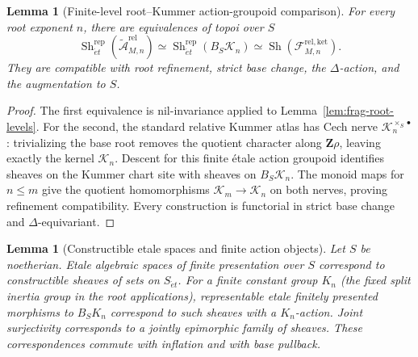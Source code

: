 \documentclass[11pt]{article}
\newtheorem{lemma}[theorem]{Lemma}
\theoremstyle{definition}
\theoremstyle{remark}
\begin{document}
\begin{lemma}[Finite-level root--Kummer action-groupoid comparison]
\label{lem:frag-finite-root-kummer-comparison}
For every root exponent $n$, there are equivalences of topoi over $S$
\begin{equation}
 \operatorname{Sh}_{\acute et}^{\mathrm{rep}}
 (\widetilde{\mathcal A}_{M,n}^{\mathrm{rel}})
 \simeq
 \operatorname{Sh}_{\acute et}^{\mathrm{rep}}(B_S\mathcal K_n)
 \simeq
 \operatorname{Sh}(\mathcal F_{M,n}^{\mathrm{rel,ket}}).
 \label{eq:frag-finite-root-kummer-topoi}
\end{equation}
They are compatible with root refinement, strict base change, the
$\Delta$-action, and the augmentation to $S$.
\end{lemma}

\begin{proof}
The first equivalence is nil-invariance applied to
Lemma~\ref{lem:frag-root-levels}.  For the second, the standard relative
Kummer atlas has Cech nerve
$\mathcal K_n^{\times_S\bullet}$: trivializing the base root removes the
quotient character along $\mathbf Z\rho$, leaving exactly the kernel
$\mathcal K_n$.  Descent for this finite \'{e}tale action groupoid identifies
sheaves on the Kummer chart site with sheaves on $B_S\mathcal K_n$.
The monoid maps for $n\leq m$ give the quotient homomorphisms
$\mathcal K_m\to\mathcal K_n$ on both nerves, proving refinement
compatibility.  Every construction is functorial in strict base change and
$\Delta$-equivariant.
\end{proof}

\begin{lemma}[Constructible etale spaces and finite action objects]
\label{lem:frag-constructible-etale-action-site}
Let $S$ be noetherian.  Etale algebraic spaces of finite presentation
over $S$ correspond to constructible sheaves of sets on $S_{\acute et}$.
For a finite constant group $K_n$ (the fixed split inertia group
in the root applications), representable etale finitely presented
morphisms to $B_SK_n$ correspond to such sheaves with a $K_n$-action.
Joint surjectivity corresponds to a jointly epimorphic family of sheaves.
These correspondences commute with inflation and with base pullback.
\end{lemma}
\end{document}
